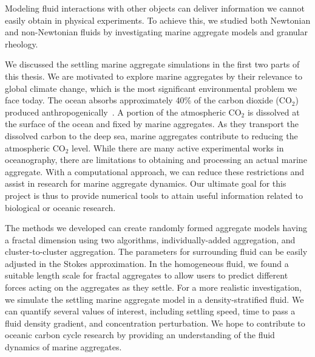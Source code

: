 
Modeling fluid interactions with other objects can deliver information we cannot easily obtain in physical experiments. To achieve this, we studied both Newtonian and non-Newtonian fluids by investigating marine aggregate models and granular rheology.
\par
We discussed the settling marine aggregate simulations in the first two parts of this thesis. 
We are motivated to explore marine aggregates by their relevance to global climate change, which is the most significant environmental problem we face today.
The ocean absorbs approximately 40\% of the carbon dioxide (CO$_2$) produced anthropogenically~\cite{omand_sinking_2020}. 
A portion of the atmospheric CO$_2$ is dissolved at the surface of the ocean and fixed by marine aggregates. As they transport the dissolved carbon to the deep sea, marine aggregates contribute to reducing the atmospheric CO$_2$ level. 
While there are many active experimental works in oceanography, there are limitations to obtaining and processing an actual marine aggregate. 
With a computational approach, we can reduce these restrictions and assist in research for marine aggregate dynamics. 
Our ultimate goal for this project is thus to provide numerical tools to attain useful information related to biological or oceanic research.
\par
The methods we developed can create randomly formed aggregate models having a fractal dimension using two algorithms, individually-added aggregation, and cluster-to-cluster aggregation. The parameters for surrounding fluid can be easily adjusted in the Stokes approximation. 
In the homogeneous fluid, we found a suitable length scale for fractal aggregates to allow users to predict different forces acting on the aggregates as they settle.
For a more realistic investigation, we simulate the settling marine aggregate model in a density-stratified fluid.
We can quantify several values of interest, including settling speed, time to pass a fluid density gradient, and concentration perturbation.
We hope to contribute to oceanic carbon cycle research by providing an understanding of the fluid dynamics of marine aggregates. 
